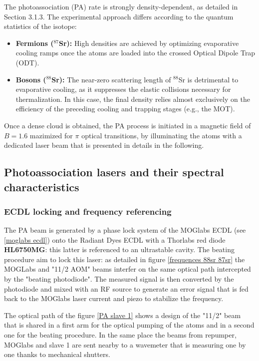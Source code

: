 The photoassociation (PA) rate is strongly density-dependent, as detailed in Section 3.1.3. 
The experimental approach differs according to the quantum statistics of the isotope:
\begin{itemize}
    \item \textbf{Fermions ($^{87}$Sr):} High densities are achieved by optimizing evaporative cooling ramps once the atoms are loaded into the crossed Optical Dipole Trap (ODT).
    \item \textbf{Bosons ($^{88}$Sr):} The near-zero scattering length of $^{88}$Sr is detrimental to evaporative cooling, as it suppresses the elastic collisions necessary for thermalization. In this case, the 
    final density relies almost exclusively on the efficiency of the preceding cooling and trapping stages (e.g., the MOT).
\end{itemize}

Once a dense cloud is obtained, the PA process is initiated in a magnetic field of $B = 1.6$ mazimized for $\pi$ 
optical transitions, by illuminating the atoms with a dedicated laser beam that is presented in details in the following.

\subsection{Photoassociation lasers and their spectral characteristics}
\subsubsection{ECDL locking and frequency referencing}
The PA beam is generated by a phase lock system of the MOGlabs ECDL (see \ref{moglabs ecdl}) onto the Radiant Dyes ECDL with a Thorlabs red diode \textbf{HL6750MG}: this latter is referenced to an ultrastable cavity.
The beating procedure aim to lock this laser: as detailed in figure \ref{frequences 88sr 87sr} the MOGLabs and "11/2 AOM" beams interfer on the same optical path intercepted by the "beating photodiode". The 
measured signal is 
then converted by the photodiode and mixed with an RF source to generate an error signal that is fed back to the MOGlabs laser current and piezo to stabilize the frequency. 

The optical path of the figure \ref{PA slave 1} shows a design of the "11/2" beam that is shared in a first arm for the optical pumping of the atoms and in a second one for the beating procedure. In the same place 
the beams from
repumper, MOGlabs and slave 1 are sent nearby to a wavemeter that is measuring one by one thanks to mechanical shutters.

